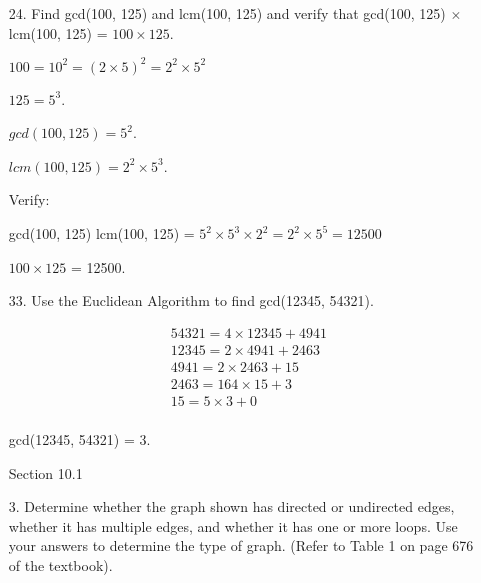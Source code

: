 \documentclass[12pt]{article}
\newenvironment{answer}{\larger[2]}{}
\begin{document}
\begin{enumerate}

\item[24.] Find gcd(100, 125) and lcm(100, 125) and verify that gcd(100, 125) $\times$ lcm(100, 125) = $100 \times 125$.

\begin{answer}
    $100 = 10^2 = (2 \times 5)^2 = 2^2 \times 5^2$

    $125 = 5^3$.

    $gcd(100, 125) = 5^2$.

    $lcm(100, 125) = 2^2 \times 5^3$.

    Verify:

    gcd(100, 125) lcm(100, 125) = $5^2 \times 5^3 \times 2^2 =2^2 \times 5^5 = 12500$

    $100 \times 125$ = 12500.
\end{answer}
\vspace{0.2in}

\newpage

\item[33.] Use the Euclidean Algorithm to find gcd(12345, 54321).

\begin{answer}
    \begin{align*}
        54321 = 4 \times 12345 + 4941 \\
        12345 = 2 \times 4941 + 2463 \\
        4941 = 2 \times 2463 + 15 \\
        2463 = 164 \times 15 + 3 \\
        15 = 5 \times 3 + 0 \\
    \end{align*}

    gcd(12345, 54321) = 3.
\end{answer}

\newpage

\begin{center}
    {\large Section 10.1}
\end{center}


\item[3.] Determine whether the graph shown has directed or undirected edges, whether it has multiple edges, and whether it has one or more loops. Use your answers to determine the type of graph. (Refer to Table 1 on page 676 of the textbook).

\hspace{50.0mm}


\end{enumerate}
\end{document}
